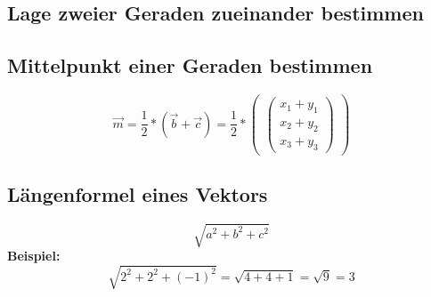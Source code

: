 \documentclass[a4paper,12pt]{article}
\begin{document}
	\subsection*{Lage zweier Geraden zueinander bestimmen}
	\subsection*{Mittelpunkt einer Geraden bestimmen}
		$$
\vec{m} = \frac{1}{2}*(\vec{b}+\vec{c})=\frac{1}{2}*
\begin{pmatrix}
\begin{pmatrix} 
x_{1}+y_{1} \\
x_{2}+y_{2} \\
x_{3}+y_{3}
\end{pmatrix}
\end{pmatrix}
$$
	\subsection*{Längenformel eines Vektors}
		$$
\sqrt{a^{2}+b^{2}+c^{2}}
$$
		\textbf{Beispiel:}
		$$
\sqrt{2^{2}+2^{2}+(-1)^{2}}=
\sqrt{4+4+1}=
\sqrt{9}=3
$$
\end{document}

